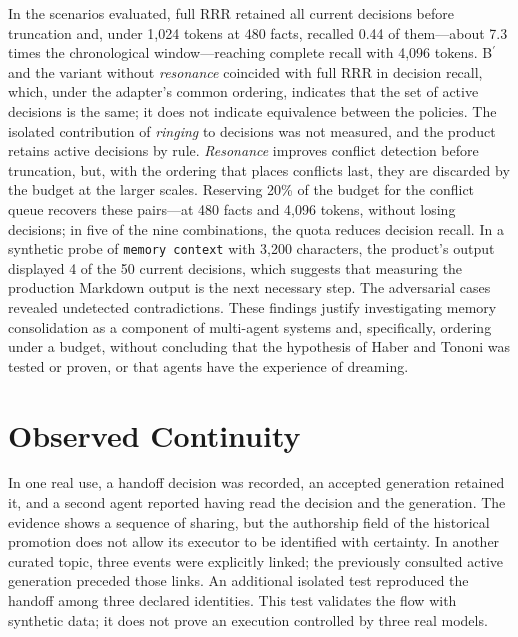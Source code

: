 \documentclass[11pt,a4paper]{article}
\begin{document}
In the scenarios evaluated, full RRR retained all current decisions before truncation and, under 1,024 tokens at 480 facts, recalled 0.44 of them---about 7.3 times the chronological window---reaching complete recall with 4,096 tokens. B\ensuremath{^{\prime}} and the variant without \emph{resonance} coincided with full RRR in decision recall, which, under the adapter's common ordering, indicates that the set of active decisions is the same; it does not indicate equivalence between the policies. The isolated contribution of \emph{ringing} to decisions was not measured, and the product retains active decisions by rule. \emph{Resonance} improves conflict detection before truncation, but, with the ordering that places conflicts last, they are discarded by the budget at the larger scales. Reserving 20\% of the budget for the conflict queue recovers these pairs---at 480 facts and 4,096 tokens, without losing decisions; in five of the nine combinations, the quota reduces decision recall. In a synthetic probe of \texttt{memory context} with 3,200 characters, the product's output displayed 4 of the 50 current decisions, which suggests that measuring the production Markdown output is the next necessary step. The adversarial cases revealed undetected contradictions. These findings justify investigating memory consolidation as a component of multi-agent systems and, specifically, ordering under a budget, without concluding that the hypothesis of Haber and Tononi was tested or proven, or that agents have the experience of dreaming.

\appendix
\section{Observed Continuity}\label{sec:A}
In one real use, a handoff decision was recorded, an accepted generation retained it, and a second agent reported having read the decision and the generation. The evidence shows a sequence of sharing, but the authorship field of the historical promotion does not allow its executor to be identified with certainty. In another curated topic, three events were explicitly linked; the previously consulted active generation preceded those links. An additional isolated test reproduced the handoff among three declared identities. This test validates the flow with synthetic data; it does not prove an execution controlled by three real models.
\end{document}
